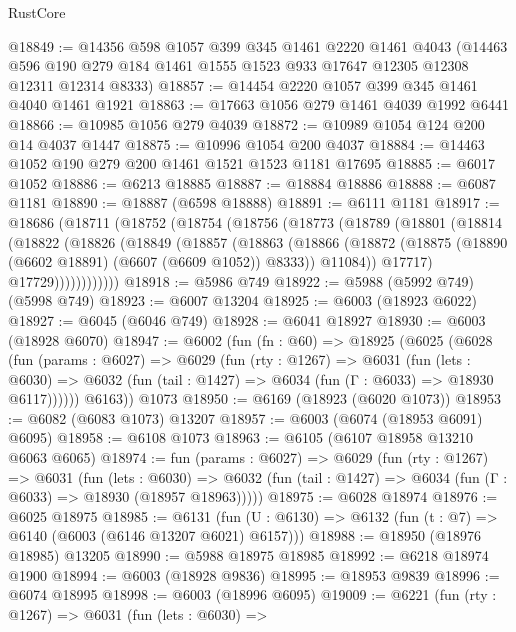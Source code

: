 \begin{lexlean}{RustCore}
\begin{coremodule}
@18849 := @14356
    @598
    @1057
    @399
    @345
    @1461
    @2220
    @1461
    @4043
    (@14463 @596 @190 @279 @184 @1461 @1555 @1523 @933 @17647 @12305 @12308 @12311 @12314 @8333)
@18857 := @14454 @2220 @1057 @399 @345 @1461 @4040 @1461 @1921
@18863 := @17663 @1056 @279 @1461 @4039 @1992 @6441
@18866 := @10985 @1056 @279 @4039
@18872 := @10989 @1054 @124 @200 @14 @4037 @1447
@18875 := @10996 @1054 @200 @4037
@18884 := @14463 @1052 @190 @279 @200 @1461 @1521 @1523 @1181 @17695
@18885 := @6017 @1052
@18886 := @6213 @18885
@18887 := @18884 @18886
@18888 := @6087 @1181
@18890 := @18887 (@6598 @18888)
@18891 := @6111 @1181
@18917 := @18686
    (@18711
      (@18752
        (@18754
          (@18756
            (@18773
              (@18789
                (@18801
                  (@18814
                    (@18822
                      (@18826
                        (@18849
                          (@18857
                            (@18863
                              (@18866
                                (@18872
                                  (@18875 (@18890 (@6602 @18891) (@6607 (@6609 @1052)) @8333))
                                  @11084))
                              @17717)
                            @17729))))))))))))
@18918 := @5986 @749
@18922 := @5988 (@5992 @749) (@5998 @749)
@18923 := @6007 @13204
@18925 := @6003 (@18923 @6022)
@18927 := @6045 (@6046 @749)
@18928 := @6041 @18927
@18930 := @6003 (@18928 @6070)
@18947 := @6002
    (fun (fn : @60) =>
    @18925
      (@6025
        (@6028
          (fun (params : @6027) =>
          @6029
            (fun (rty : @1267) =>
            @6031
              (fun (lets : @6030) =>
              @6032 (fun (tail : @1427) => @6034 (fun (Γ : @6033) => @18930 @6117))))))
        @6163))
    @1073
@18950 := @6169 (@18923 (@6020 @1073))
@18953 := @6082 (@6083 @1073) @13207
@18957 := @6003 (@6074 (@18953 @6091) @6095)
@18958 := @6108 @1073
@18963 := @6105 (@6107 @18958 @13210 @6063 @6065)
@18974 := fun (params : @6027) =>
  @6029
    (fun (rty : @1267) =>
    @6031
      (fun (lets : @6030) =>
      @6032 (fun (tail : @1427) => @6034 (fun (Γ : @6033) => @18930 (@18957 @18963)))))
@18975 := @6028 @18974
@18976 := @6025 @18975
@18985 := @6131
    (fun (U : @6130) => @6132 (fun (t : @7) => @6140 (@6003 (@6146 @13207 @6021) @6157)))
@18988 := @18950 (@18976 @18985) @13205
@18990 := @5988 @18975 @18985
@18992 := @6218 @18974 @1900
@18994 := @6003 (@18928 @9836)
@18995 := @18953 @9839
@18996 := @6074 @18995
@18998 := @6003 (@18996 @6095)
@19009 := @6221
    (fun (rty : @1267) =>
    @6031
      (fun (lets : @6030) =>

\end{coremodule}
\end{lexlean}
